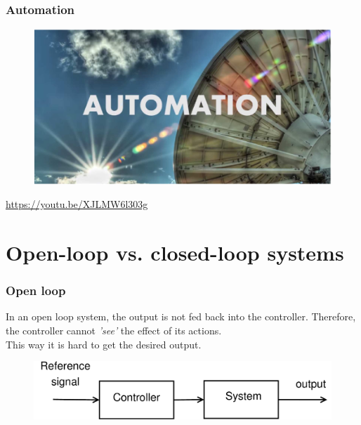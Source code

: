 \documentclass{beamer}
\begin{document}

\begin{frame}
\frametitle{Automation}
\begin{figure}
\includegraphics[width=1\linewidth]{automation}
\end{figure}
\url{https://youtu.be/XJLMW6l303g}
\end{frame}

\section{Open-loop vs. closed-loop systems} 

\begin{frame}
\frametitle{Open loop}
\vspace{-4ex}
In an open loop system, the output is not fed back into the controller. Therefore, the controller cannot \textit{'see'} the effect of its actions. \\
This way it is hard to get the desired output.\\
\bigskip
\begin{figure}
\includegraphics[width=1\linewidth]{open_loop}
\end{figure}
\end{frame}

\end{document}
